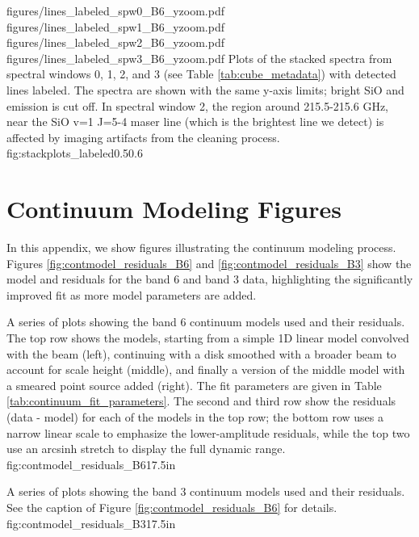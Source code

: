 \documentclass[twocolumn]{aastex61}
\begin{document}


\FigureFourVertical
{figures/lines_labeled_spw0_B6_yzoom.pdf}
{figures/lines_labeled_spw1_B6_yzoom.pdf}
{figures/lines_labeled_spw2_B6_yzoom.pdf}
{figures/lines_labeled_spw3_B6_yzoom.pdf}
{Plots of the stacked spectra from spectral windows 0, 1, 2, and 3 (see Table \ref{tab:cube_metadata})
with detected lines labeled.  The spectra are shown with the same y-axis limits; bright SiO and \water
emission is cut off.  In spectral window 2, the region around 215.5-215.6 GHz, near the SiO v=1 J=5-4
maser line (which is the brightest line we detect) is affected by imaging artifacts from the cleaning
process.}
{fig:stackplots_labeled}{0.5}{0.6\linewidth}

\section{Continuum Modeling Figures}
\label{appendix:contmodel}
In this appendix, we show figures illustrating the continuum modeling process.
Figures \ref{fig:contmodel_residuals_B6} and \ref{fig:contmodel_residuals_B3}
show the model and residuals for the band 6 and band 3 data, highlighting the
significantly improved fit as more model parameters are added.

{A series of plots showing the band 6 continuum models used and their residuals.
The top row shows the models, starting from a simple 1D linear model convolved
with the beam (left), continuing with a disk smoothed with a broader beam to
account for scale height (middle), and finally a version of the middle model
with a smeared point source added (right).  The fit parameters are given in Table
\ref{tab:continuum_fit_parameters}.  The second and third row show the
residuals (data - model) for each of the models in the top row; the bottom row
uses a narrow linear scale to emphasize the lower-amplitude residuals, while
the top two use an arcsinh stretch to display the full dynamic range.
}
{fig:contmodel_residuals_B6}{1}{7.5in}


{A series of plots showing the band 3 continuum models used and their residuals.
See the caption of Figure \ref{fig:contmodel_residuals_B6} for details.
}
{fig:contmodel_residuals_B3}{1}{7.5in}
\end{document}
